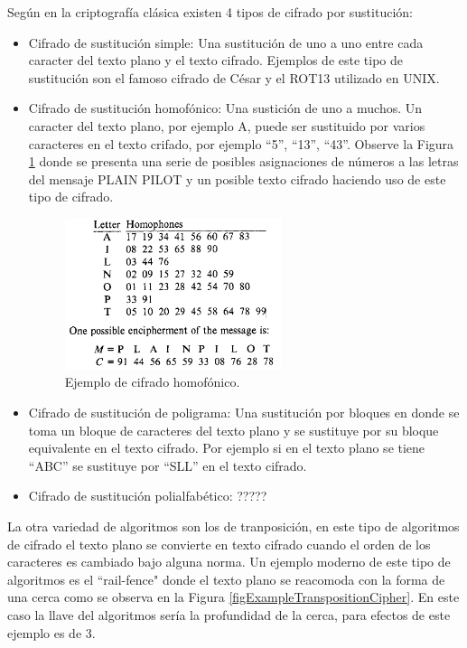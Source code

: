 Según \cite{bruce} en la criptografía clásica existen 4 tipos de cifrado por sustitución:
\begin{itemize}
\item Cifrado de sustitución simple: Una sustitución de uno a uno entre cada caracter del texto plano y el texto cifrado.
Ejemplos de este tipo de sustitución son el famoso cifrado de César y el ROT13 utilizado en UNIX.

\item Cifrado de sustitución homofónico: Una sustición de uno a muchos. Un caracter del texto plano, por ejemplo A, puede ser sustituido por varios caracteres en el texto crifado, por ejemplo ``5'', ``13'', ``43''. Observe la Figura \ref{figExampleHomophonicCipher} donde se presenta una serie de posibles asignaciones de números a las letras del mensaje PLAIN PILOT y un posible texto cifrado haciendo uso de este tipo de cifrado.

\begin{figure}
	\centering
	\includegraphics[width=0.6\textwidth]{./images/figExampleHomophonicCipher}
	\caption{Ejemplo de cifrado homofónico.}
	\label{figExampleHomophonicCipher}
\end{figure}


\item Cifrado de sustitución de poligrama: Una sustitución por bloques en donde se toma un bloque de caracteres del texto plano y se sustituye por su bloque equivalente en el texto cifrado. Por ejemplo si en el texto plano se tiene ``ABC'' se sustituye por ``SLL'' en el texto cifrado.

\item Cifrado de sustitución polialfabético: ????? 
\end{itemize}

La otra variedad de algoritmos son los de tranposición, en este tipo de algoritmos de cifrado el texto plano se convierte en texto cifrado cuando el orden de los caracteres es cambiado bajo alguna norma. Un ejemplo moderno de este tipo de algoritmos es el ``rail-fence" donde el texto plano se reacomoda con la forma de una cerca como se observa en la Figura \ref{figExampleTranspositionCipher}. En este caso la llave del algoritmos sería la profundidad de la cerca, para efectos de este ejemplo es de 3.

